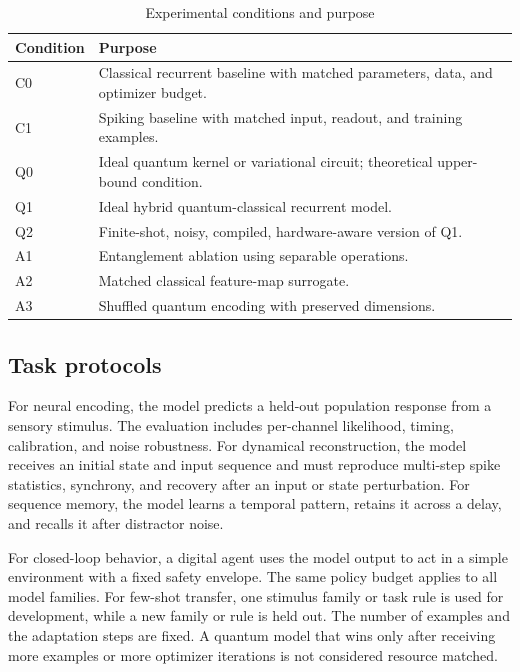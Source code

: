 \documentclass[conference]{IEEEtran}
\begin{document}
\begin{table}[t]
\caption{Experimental conditions and purpose}
\label{tab:conditions}
\centering
\footnotesize
\begin{tabular}{p{}p{}}
\hline
Condition & Purpose \\
\hline
C0 & Classical recurrent baseline with matched parameters, data, and optimizer budget. \\
C1 & Spiking baseline with matched input, readout, and training examples. \\
Q0 & Ideal quantum kernel or variational circuit; theoretical upper-bound condition. \\
Q1 & Ideal hybrid quantum-classical recurrent model. \\
Q2 & Finite-shot, noisy, compiled, hardware-aware version of Q1. \\
A1 & Entanglement ablation using separable operations. \\
A2 & Matched classical feature-map surrogate. \\
A3 & Shuffled quantum encoding with preserved dimensions. \\
\hline
\end{tabular}
\end{table}

\subsection{Task protocols}

For neural encoding, the model predicts a held-out population response from a sensory
stimulus. The evaluation includes per-channel likelihood, timing, calibration, and
noise robustness. For dynamical reconstruction, the model receives an initial state
and input sequence and must reproduce multi-step spike statistics, synchrony, and
recovery after an input or state perturbation. For sequence memory, the model learns a
temporal pattern, retains it across a delay, and recalls it after distractor noise.

For closed-loop behavior, a digital agent uses the model output to act in a simple
environment with a fixed safety envelope. The same policy budget applies to all model
families. For few-shot transfer, one stimulus family or task rule is used for
development, while a new family or rule is held out. The number of examples and the
adaptation steps are fixed. A quantum model that wins only after receiving more examples
or more optimizer iterations is not considered resource matched.
\end{document}
